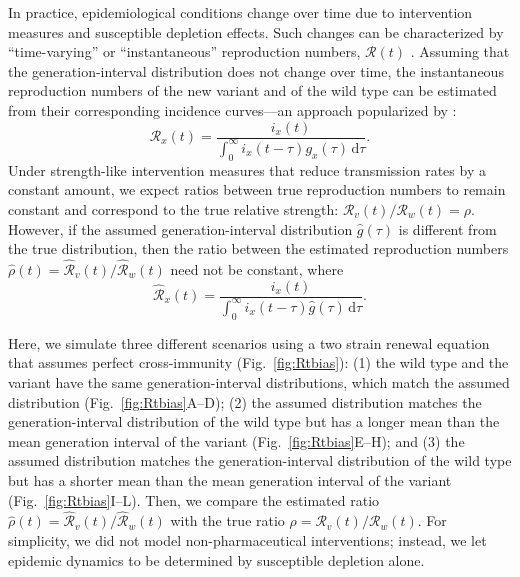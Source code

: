 \documentclass[12pt]{article}
\newcommand{\fref}[1]{Fig.~\ref{fig:#1}}
\newcommand{\RR}{\ensuremath{{\mathcal R}}\xspace}
\newcommand{\dd}[1]{\ensuremath{\, \mathrm{d}#1}}
\newcommand{\dtau}{\dd{\tau}}
\begin{document}
In practice, epidemiological conditions change over time due to intervention measures and susceptible depletion effects.
Such changes can be characterized by ``time-varying'' or ``instantaneous'' reproduction numbers, $\RR(t)$ \citep{fraser2007estimating}.
Assuming that the generation-interval distribution does not change over time, the instantaneous reproduction numbers of the new variant and of the wild type can be estimated from their corresponding incidence curves---an approach popularized by \cite{cori2013new}:
\begin{equation}
\RR_x(t) = \frac{i_x(t)}{\int_0^\infty i_x(t-\tau) g_x(\tau) \dtau}.
\end{equation}
Under strength-like intervention measures that reduce transmission rates by a constant amount, we expect ratios between true reproduction numbers to remain constant and correspond to the true relative strength: $\RR_v(t)/\RR_w(t) = \rho$.
However, if the assumed generation-interval distribution $\hat{g}(\tau)$ is different from the true distribution, then the ratio between the estimated reproduction numbers $\hat{\rho}(t) = \hat{\RR}_v(t)/\hat{\RR}_w(t)$ need not be constant, where
\begin{equation}
\hat{\RR}_x(t) = \frac{i_x(t)}{\int_0^\infty i_x(t-\tau) \hat{g}(\tau) \dtau}.
\end{equation}

Here, we simulate three different scenarios using a two strain renewal equation that assumes perfect cross-immunity (\fref{Rtbias}): 
(1) the wild type and the variant have the same generation-interval distributions, which match the assumed distribution (\fref{Rtbias}A--D);
(2) the assumed distribution matches the generation-interval distribution of the wild type but has a longer mean than the mean generation interval of the variant (\fref{Rtbias}E--H); and
(3) the assumed distribution matches the generation-interval distribution of the wild type but has a shorter mean than the mean generation interval of the variant (\fref{Rtbias}I--L).
Then, we compare the estimated ratio $\hat{\rho}(t) = \hat{\RR}_v(t)/\hat{\RR}_w(t)$ with the true ratio $\rho = \RR_v(t)/\RR_w(t)$.
For simplicity, we did not model non-pharmaceutical interventions;
instead, we let epidemic dynamics to be determined by susceptible depletion alone.
\end{document}
